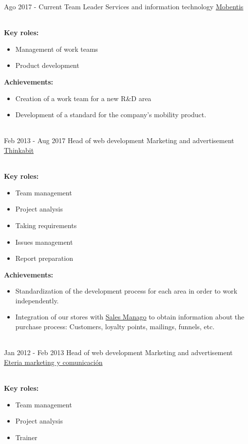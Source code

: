 \documentclass[letterpaper]{twentysecondcv} %
\begin{document}
\begin{twenty} %
	\twentyitem%
	{Ago 2017 -}
	{Current}
	{Team Leader}
	{Services and information technology}
	{\href{http://www.mobentis.com/}{Mobentis}}
	{\\
		\textbf{Key roles:}
		\begin{itemize}
			\item Management of work teams
			\item Product development
		\end{itemize}

		\textbf{Achievements:}
		\begin{itemize}
			\item Creation of a work team for a new R\&D area
			\item Development of a standard for the company's mobility product.
		\end{itemize}
	}
	\\
    	\twentyitem%
	{Feb 2013 -}
	{Aug 2017}
	{Head of web development}
	{Marketing and advertisement}
	{\href{http://www.thinkabit.es/}{Thinkabit}}
	{\\
		\textbf{Key roles:}
		\begin{itemize}
			\item Team management
			\item Project analysis
			\item Taking requirements
			\item Issues management
			\item Report preparation
		\end{itemize}

		\textbf{Achievements:}
		\begin{itemize}
			\item Standardization of the development process for each area in order to work independently.
			\item Integration of our stores with \href{http://salesmanago.com/}{Sales Manago} to obtain information about the purchase process: Customers, loyalty points, mailings, funnels, etc.
		\end{itemize}
	}
	\\
	\twentyitem%
	{Jan 2012 -}
	{Feb 2013}
	{Head of web development}
	{Marketing and advertisement}
	{\href{http://www.eteria.es}{Eteria marketing y comunicación}}
	{\\
		\textbf{Key roles:}
		\begin{itemize}
			\item Team management
			\item Project analysis
			\item Trainer
		\end{itemize}

}
\end{twenty}
\end{document}
